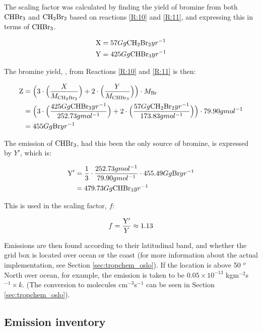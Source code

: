\medskip

The scaling factor was calculated by finding the yield of bromine from both $\mathrm{CHBr_3}$ and $\mathrm{CH_2Br_2}$ based on reactions \ref{R:10} and \ref{R:11}, and expressing this in terms of $\mathrm{CHBr_3}$. 

\begin{align*}
    \mathrm{X} & = 57 Gg \mathrm{CH_2Br_2}yr^{-1} \\
    \mathrm{Y} & = 425 Gg \mathrm{CHBr_3}yr^{-1} 
\end{align*}

The bromine yield, , from Reactions \ref{R:10} and \ref{R:11} is then: 

\begin{align*}
    \mathrm{Z} & = \Big(3\cdot\Big(\frac{X}{M_{\mathrm{CH_2Br_2}}}\Big) + 2\cdot\Big(\frac{Y}{M_{\mathrm{CHBr_3}}}\Big)\Big)\cdot M_{\mathrm{Br}} \\
    & = \Big(3\cdot\Big(\frac{425 Gg \mathrm{CHBr_3}yr^{-1}}{252.73 g mol^{-1}}\Big) + 2\cdot\Big(\frac{57 Gg \mathrm{CH_2Br_2}yr^{-1}}{173.83 g mol^{-1}}\Big)\Big)\cdot79.90 g mol^{-1} \\
    & = 455 Gg\mathrm{Br}yr^{-1}
\end{align*}

The emission of $\mathrm{CHBr_3}$, had this been the only source of bromine, is expressed by $Y'$, which is: 

\begin{align*}
    \mathrm{Y'} & = \frac{1}{3}\cdot\frac{252.73 g mol^{-1}}{79.90 g mol^{-1}}\cdot455.49Gg\mathrm{Br}yr^{-1} \\
    & = 479.73 Gg \mathrm{CHBr_3}yr^{-1}
\end{align*}

This is used in the scaling factor, $f$:

\begin{equation*}
    f = \frac{\mathrm{Y'}}{Y} \approx 1.13
\end{equation*}


Emissions are then found according to their latitudinal band, and whether the grid box is located over ocean or the coast (for more information about the actual implementation, see Section \ref{sec:tropchem_oslo}). If the location is above 50 $^o$ North over ocean, for example, the emission is taken to be $0.05\times10^{-13}$ kgm$^{-2}$s$^{-1}\times k$. (The conversion to molecules cm$^{-3}$s$^{-1}$ can be seen in Section \ref{sec:tropchem_oslo}). 


\subsection{Emission inventory}

